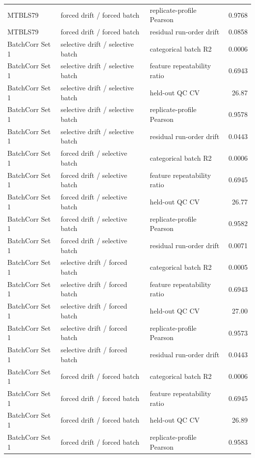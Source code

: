 \begin{longtable}{lllr}
MTBLS79 & forced drift / forced batch & replicate-profile Pearson & 0.9768 \\
MTBLS79 & forced drift / forced batch & residual run-order drift & 0.0858 \\
BatchCorr Set 1 & selective drift / selective batch & categorical batch R2 & 0.0006 \\
BatchCorr Set 1 & selective drift / selective batch & feature repeatability ratio & 0.6943 \\
BatchCorr Set 1 & selective drift / selective batch & held-out QC CV & 26.87 \\
BatchCorr Set 1 & selective drift / selective batch & replicate-profile Pearson & 0.9578 \\
BatchCorr Set 1 & selective drift / selective batch & residual run-order drift & 0.0443 \\
BatchCorr Set 1 & forced drift / selective batch & categorical batch R2 & 0.0006 \\
BatchCorr Set 1 & forced drift / selective batch & feature repeatability ratio & 0.6945 \\
BatchCorr Set 1 & forced drift / selective batch & held-out QC CV & 26.77 \\
BatchCorr Set 1 & forced drift / selective batch & replicate-profile Pearson & 0.9582 \\
BatchCorr Set 1 & forced drift / selective batch & residual run-order drift & 0.0071 \\
BatchCorr Set 1 & selective drift / forced batch & categorical batch R2 & 0.0005 \\
BatchCorr Set 1 & selective drift / forced batch & feature repeatability ratio & 0.6943 \\
BatchCorr Set 1 & selective drift / forced batch & held-out QC CV & 27.00 \\
BatchCorr Set 1 & selective drift / forced batch & replicate-profile Pearson & 0.9573 \\
BatchCorr Set 1 & selective drift / forced batch & residual run-order drift & 0.0443 \\
BatchCorr Set 1 & forced drift / forced batch & categorical batch R2 & 0.0006 \\
BatchCorr Set 1 & forced drift / forced batch & feature repeatability ratio & 0.6945 \\
BatchCorr Set 1 & forced drift / forced batch & held-out QC CV & 26.89 \\
BatchCorr Set 1 & forced drift / forced batch & replicate-profile Pearson & 0.9583 \\

\end{longtable}
